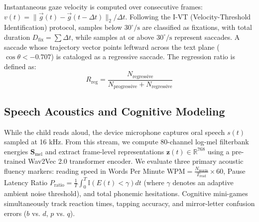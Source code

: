 \documentclass[conference]{IEEEtran}
\begin{document}
Instantaneous gaze velocity is computed over consecutive frames: $v(t) = \|\vec{g}(t) - \vec{g}(t - \Delta t)\|_2 / \Delta t$. Following the I-VT (Velocity-Threshold Identification) protocol, samples below $30^\circ/\text{s}$ are classified as fixations, with total duration $D_{\text{fix}} = \sum \Delta t$, while samples at or above $30^\circ/\text{s}$ represent saccades. A saccade whose trajectory vector points leftward across the text plane ($\cos \theta < -0.707$) is cataloged as a regressive saccade. The regression ratio is defined as:
\begin{equation}
R_{\text{reg}} = \frac{N_{\text{regressive}}}{N_{\text{progressive}} + N_{\text{regressive}}}
\end{equation}

\subsection{Speech Acoustics and Cognitive Modeling}
While the child reads aloud, the device microphone captures oral speech $s(t)$ sampled at 16 kHz. From this stream, we compute 80-channel log-mel filterbank energies $\mathbf{S}_{\text{mel}}$ and extract frame-level representations $\mathbf{z}(t) \in \mathbb{R}^{768}$ using a pre-trained Wav2Vec 2.0 transformer encoder. We evaluate three primary acoustic fluency markers: reading speed in Words Per Minute $\text{WPM} = \frac{N_{\text{words}}}{T_{\text{read}}} \times 60$, Pause Latency Ratio $P_{\text{ratio}} = \frac{1}{T} \int_{0}^T \mathbb{I}(E(t) < \gamma) dt$ (where $\gamma$ denotes an adaptive ambient noise threshold), and total phonemic hesitations. Cognitive mini-games simultaneously track reaction times, tapping accuracy, and mirror-letter confusion errors ($b$ vs. $d$, $p$ vs. $q$).
\end{document}
